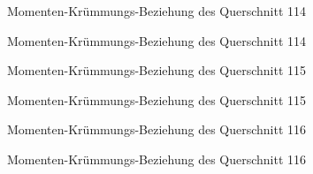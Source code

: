 \documentclass[
  11pt,
  letterpaper,
]{scrreprt}
\begin{document}
\begin{figure}[H]


\caption{\label{fig-qs_114}Momenten-Krümmungs-Beziehung des Querschnitt
114}

\end{figure}%

\begin{figure}[H]


\caption{\label{fig-m_chi_114}Momenten-Krümmungs-Beziehung des
Querschnitt 114}

\end{figure}%

\begin{figure}[H]


\caption{\label{fig-qs_115}Momenten-Krümmungs-Beziehung des Querschnitt
115}

\end{figure}%

\begin{figure}[H]


\caption{\label{fig-m_chi_115}Momenten-Krümmungs-Beziehung des
Querschnitt 115}

\end{figure}%

\begin{figure}[H]


\caption{\label{fig-qs_116}Momenten-Krümmungs-Beziehung des Querschnitt
116}

\end{figure}%

\begin{figure}[H]


\caption{\label{fig-m_chi_116}Momenten-Krümmungs-Beziehung des
Querschnitt 116}

\end{figure}%
\end{document}
